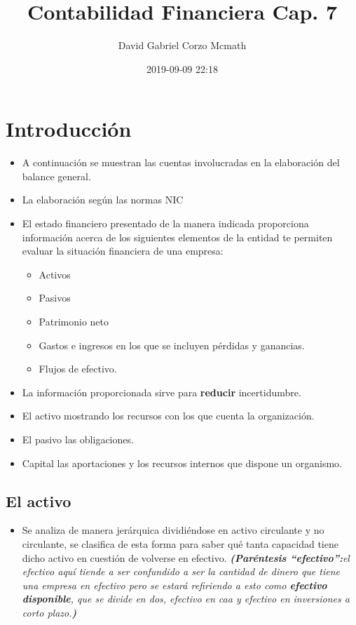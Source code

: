 \documentclass{article}
\author{David Gabriel Corzo Mcmath}
\title{Contabilidad Financiera Cap. 7}
\date{2019-09-09 22:18}
\begin{document}
\maketitle
\section{Introducción}
\begin{itemize}
    \item A continuación se muestran las cuentas involucradas en la elaboración del balance general.
    \item La elaboración según las normas NIC
    \item El estado financiero presentado de la manera indicada proporciona información acerca de los siguientes elementos de la entidad te permiten evaluar la situación financiera de una empresa:
    \begin{itemize}
        \item Activos
        \item Pasivos
        \item Patrimonio neto
        \item Gastos e ingresos en los que se incluyen pérdidas y ganancias.
        \item Flujos de efectivo.
    \end{itemize}
    
    \item La información proporcionada sirve para \textbf{reducir} incertidumbre.
    \item El activo mostrando los recursos con los que cuenta la organización.
    \item El pasivo las obligaciones.
    \item Capital las aportaciones y los recursos internos que dispone un organismo.
    
\end{itemize}


\subsection{El activo}
\begin{itemize}
    \item Se analiza de manera jerárquica dividiéndose en activo circulante y no circulante, se clasifica de esta forma para saber qué tanta capacidad tiene dicho activo en cuestión de volverse en efectivo. \emph{\textbf{(Paréntesis ``efectivo'':}el efectivo aquí tiende a ser confundido a ser la cantidad de dinero que tiene una empresa en efectivo pero se estará refiriendo a esto como \textbf{efectivo disponible}, que se divide en dos, \emph{efectivo en caa y efectivo en inversiones a corto plazo.}\textbf{)}}
\end{itemize}
\end{document}
